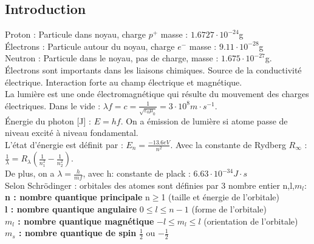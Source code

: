 \documentclass[../main.tex]{subfiles}
\begin{document}
\localtableofcontents
\subsection{Introduction}
Proton : Particule dans noyau, charge $p^+$ masse : $1.6727\cdot 10^{-24}$g\\
Électrons : Particule autour du noyau, charge $e^-$ masse : $9.11\cdot 10^{-28}$g\\
Neutron : Particule dans le noyau, pas de charge, masse : $1.675\cdot 10^{-27}$g.\\

Électrons sont importants dans les liaisons chimiques. Source de la conductivité électrique. Interaction forte au champ électrique et magnétique. \\
La lumière est une onde électromagnétique qui résulte du mouvement des charges électriques. Dans le vide : $\lambda f = c = \frac{1}{\sqrt{\varepsilon_0 \mu_0}} = 3\cdot 10^8m\cdot s^{-1}$.\\
Énergie du photon [J] : $E = hf$. On a émission de lumière si atome passe de niveau excité à niveau fondamental. \\
L'état d'énergie est définit par : $E_n = \frac{-13.6 eV}{n^2}$. Avec la constante de Rydberg $R_{\infty}$ : $\frac{1}{\lambda} = R_{\lambda} (\frac{1}{n_1^2}- \frac{1}{n_2^2})$.\\
De plus, on a $\lambda = \frac{h}{mf}$, avec h: constante de plack : $6.63\cdot 10^{-34}J\cdot s$\\
Selon Schrödinger : orbitales des atomes sont définies par 3 nombre entier n,l,$m_l$:\\
\textbf{n : nombre quantique principale} n$\geq$1 (taille et énergie de l'orbitale)\\
\textbf{l : nombre quantique angulaire} $0\leq l \leq n-1$ (forme de l'orbitale)\\
\textbf{$m_l$ : nombre quantique magnétique} $-l \leq m_l \leq l$ (orientation de l'orbitale)\\
\textbf{$m_s$ : nombre quantique de spin} $\frac{1}{2}$ ou $-\frac{1}{2}$\\
\end{document}
